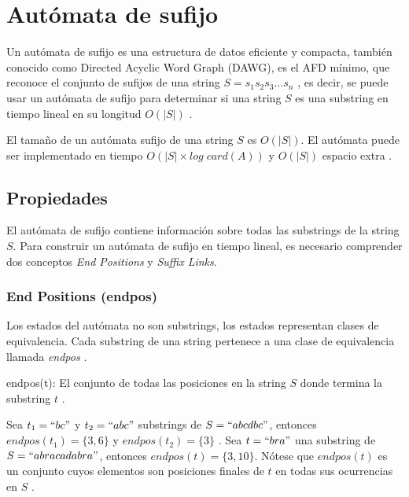 \section{Autómata de sufijo}\label{SuffixAutomaton}
Un autómata de sufijo es una estructura de datos eficiente y compacta, también conocido como Directed Acyclic Word Graph (DAWG), es el \acrshort{AFD} mínimo, que reconoce el conjunto de sufijos de una \gls{string} $S  = s_1 s_2 s_3 \dots s_n $ \cite{wiki:Suffix_automaton}, es decir, se puede usar un autómata de sufijo para determinar si una \gls{string} $S$ es una \gls{substring} en tiempo lineal en su longitud $O(| S |)$ \cite{article:10.1016/j.tcs.2009.03.034}.

\begin{theorem}[Principal]
El tamaño de un autómata sufijo de una \gls{string} $S$ es $O(| S |)$. El autómata puede ser implementado en tiempo $O(| S | \times log \; card(A))$ y $O(|S|)$ espacio extra \cite{book:Crochemore1997}.
\end{theorem}


\subsection{Propiedades}
El autómata de sufijo contiene información sobre todas las \glspl{substring} de la \gls{string} $S$. Para construir un autómata de sufijo en tiempo lineal, es necesario comprender dos conceptos \textit{End Positions} y \textit{Suffix Links}.

\subsubsection{End Positions (endpos)}
Los estados del autómata no son \glspl{substring}, los estados representan clases de equivalencia. Cada \gls{substring} de una \gls{string} pertenece a una clase de equivalencia llamada \textit{endpos} \cite{youtube:Automatas_de_Sufijos}.

\begin{definition}
	endpos(t): El conjunto de todas las posiciones en la \gls{string} $S$ donde termina la \gls{substring} $t$ \cite{web:suffix-automata}.
\end{definition}

\begin{example}
	Sea $t_1=``bc"$ y $t_2=``abc"$ \glspl{substring} de $S = ``abcdbc"$, entonces $endpos(t_1) = \{3, 6\}$ y $endpos(t_2) = \{3\}$ \cite{web:suffix-automata}.
	Sea $t=``bra"$ una \gls{substring} de $S = ``abracadabra"$, entonces $endpos(t) = \{3, 10\}$.
	Nótese que $endpos(t)$ es un conjunto cuyos elementos son posiciones finales de $t$ en todas sus ocurrencias en $S$ \cite{youtube:Automatas_de_Sufijos}.
\end{example}

